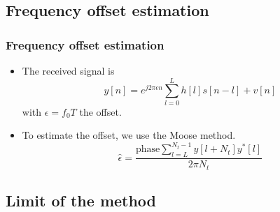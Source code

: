 \documentclass[11pt]{beamer}
\begin{document}
\subsection{Frequency offset estimation}
\begin{frame}
\frametitle{Frequency offset estimation}
\begin{itemize}
\item The received signal is
\begin{equation}
y[n] = e^{j2\pi \epsilon n} \sum_{l=0}^{L}{h[l]s[n-l]+v[n]}
\end{equation}
with $\epsilon = f_0 T$ the offset.
\item To estimate the offset, we use the Moose method.
\begin{equation}
\hat{\epsilon} = \frac{\text{phase} \sum_{l=L}^{N_t-1}{y[l+N_t]y^*[l]}}{2\pi N_t}
\end{equation}

\end{itemize}

\end{frame}

\subsection{Limit of the method}
\end{document}
